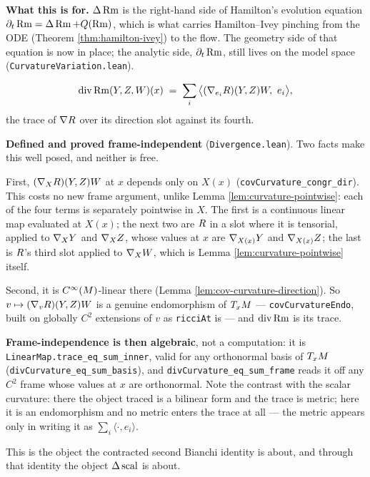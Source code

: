 \begin{definition}
  \textbf{What this is for.} $\Delta\operatorname{Rm}$ is the right-hand side of Hamilton's
  evolution equation $\partial_t \operatorname{Rm} = \Delta\operatorname{Rm} + Q(\operatorname{Rm})$, which is what
  carries Hamilton--Ivey pinching from the ODE (Theorem
  \ref{thm:hamilton-ivey}) to the flow. The geometry side of that equation is
  now in place; the analytic side, $\partial_t\operatorname{Rm}$, still lives on the model
  space (\texttt{CurvatureVariation.lean}).
\end{definition}

\begin{definition}
  \label{def:div-curvature}
  \leanok
  \[
    \operatorname{div}\operatorname{Rm}(Y,Z,W)(x)
      \;=\; \sum_i \big\langle (\nabla_{e_i}R)(Y,Z)W,\ e_i \big\rangle,
  \]
  the trace of $\nabla R$ over its direction slot against its fourth.

  \textbf{Defined and proved frame-independent} (\texttt{Divergence.lean}). Two
  facts make this well posed, and neither is free.

  First, $(\nabla_XR)(Y,Z)W$ at $x$ depends only on $X(x)$
  (\texttt{covCurvature\_congr\_dir}). This costs no new frame argument, unlike
  Lemma \ref{lem:curvature-pointwise}: each of the four terms is separately
  pointwise in $X$. The first is a continuous linear map evaluated at $X(x)$;
  the next two are $R$ in a slot where it is tensorial, applied to
  $\nabla_X Y$ and $\nabla_X Z$, whose values at $x$ are $\nabla_{X(x)}Y$ and
  $\nabla_{X(x)}Z$; the last is $R$'s third slot applied to $\nabla_X W$, which
  is Lemma \ref{lem:curvature-pointwise} itself.

  Second, it is $C^\infty(M)$-linear there
  (Lemma \ref{lem:cov-curvature-direction}). So
  $v \mapsto (\nabla_vR)(Y,Z)W$ is a genuine endomorphism of $T_xM$ ---
  \texttt{covCurvatureEndo}, built on globally $C^2$ extensions of $v$ as
  \texttt{ricciAt} is --- and $\operatorname{div}\operatorname{Rm}$ is its trace.

  \textbf{Frame-independence is then algebraic}, not a computation: it is
  \texttt{LinearMap.trace\_eq\_sum\_inner}, valid for any orthonormal basis of
  $T_xM$ (\texttt{divCurvature\_eq\_sum\_basis}), and
  \texttt{divCurvature\_eq\_sum\_frame} reads it off any $C^2$ frame whose
  values at $x$ are orthonormal. Note the contrast with the scalar curvature:
  there the object traced is a bilinear form and the trace is metric; here it
  is an endomorphism and no metric enters the trace at all --- the metric
  appears only in writing it as $\sum_i \langle \cdot, e_i\rangle$.

  This is the object the contracted second Bianchi identity is about, and
  through that identity the object $\Delta \operatorname{scal}$ is about.
\end{definition}


